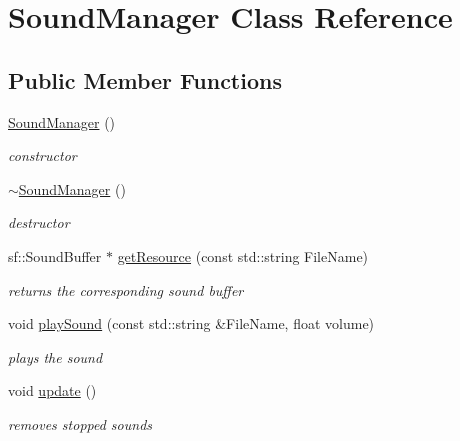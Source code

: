 \hypertarget{class_sound_manager}{\section{Sound\+Manager Class Reference}
\label{class_sound_manager}
}
\subsection*{Public Member Functions}
\begin{DoxyCompactItemize}
\item 
\hypertarget{class_sound_manager_abcc1fbf3488be5788a42c9a4fe56df35}{\hyperlink{class_sound_manager_abcc1fbf3488be5788a42c9a4fe56df35}{Sound\+Manager} ()}\label{class_sound_manager_abcc1fbf3488be5788a42c9a4fe56df35}

\begin{DoxyCompactList}\small\item\em constructor \end{DoxyCompactList}\item 
\hypertarget{class_sound_manager_ad5dbf8eab22db48ff8f3db51b02f8938}{\hyperlink{class_sound_manager_ad5dbf8eab22db48ff8f3db51b02f8938}{$\sim$\+Sound\+Manager} ()}\label{class_sound_manager_ad5dbf8eab22db48ff8f3db51b02f8938}

\begin{DoxyCompactList}\small\item\em destructor \end{DoxyCompactList}\item 
\hypertarget{class_sound_manager_a2f7b7e41ee48fb7676f788f5dcff1602}{sf\+::\+Sound\+Buffer $\ast$ \hyperlink{class_sound_manager_a2f7b7e41ee48fb7676f788f5dcff1602}{get\+Resource} (const std\+::string File\+Name)}\label{class_sound_manager_a2f7b7e41ee48fb7676f788f5dcff1602}

\begin{DoxyCompactList}\small\item\em returns the corresponding sound buffer \end{DoxyCompactList}\item 
\hypertarget{class_sound_manager_a595e93c28344c2661fb452c5c07358aa}{void \hyperlink{class_sound_manager_a595e93c28344c2661fb452c5c07358aa}{play\+Sound} (const std\+::string \&File\+Name, float volume)}\label{class_sound_manager_a595e93c28344c2661fb452c5c07358aa}

\begin{DoxyCompactList}\small\item\em plays the sound \end{DoxyCompactList}\item 
\hypertarget{class_sound_manager_a05cb0697f1a993704821098883a291f5}{void \hyperlink{class_sound_manager_a05cb0697f1a993704821098883a291f5}{update} ()}\label{class_sound_manager_a05cb0697f1a993704821098883a291f5}

\begin{DoxyCompactList}\small\item\em removes stopped sounds \end{DoxyCompactList}\end{DoxyCompactItemize}
